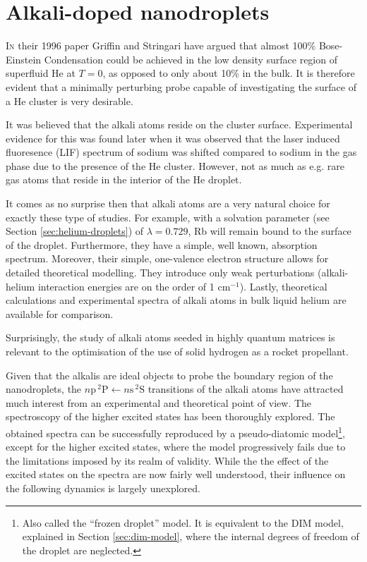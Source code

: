 \chapter{Alkali-doped nanodroplets}

	\lettrine[lines=4,findent=3pt,nindent=0pt]{\color{niceBlue1}I}{n} their 1996 paper\citep{Griffin1996} Griffin and Stringari have argued that almost 100\% Bose-Einstein Condensation could be achieved in the low density surface region of superfluid He at $T=0$, as opposed to only about 10\% in the bulk. It is therefore evident that a minimally perturbing probe capable of investigating the surface of a He cluster is very desirable.

	It was believed\citep{Dalfovo1994} that the alkali atoms reside on the cluster surface. Experimental evidence for this was found\citep{Stienkemeier1995-1,Stienkemeier1995-2,Ancilotto1995} later when it was observed that the laser induced fluoresence (LIF) spectrum of sodium was shifted compared to sodium in the gas phase due to the presence of the He cluster. However, not as much as e.g. rare gas atoms that reside in the interior of the He droplet.
	
	It comes as no surprise then that alkali atoms are a very natural choice for exactly these type of studies.  For example, with a solvation parameter (see Section \ref{sec:helium-droplets}) of $\lambda=0.729$\citep{Anc95}, Rb will remain bound to the surface of the droplet. Furthermore, they have a simple, well known, absorption spectrum. Moreover, their simple, one-valence electron structure allows for detailed theoretical modelling. They introduce only weak perturbations (alkali-helium interaction energies are on the order of 1 cm$^{-1}$\citep{Pat91}). Lastly, theoretical calculations\citep{Ancilotto1995,Kanorsky1994} and experimental spectra\citep{Tabbert1995,Takahashi1993,Beijersbergen1993} of alkali atoms in bulk liquid helium are available for comparison.

	Surprisingly, the study of alkali atoms seeded in highly quantum matrices is relevant to the optimisation of the use of solid hydrogen as a rocket propellant\citep{Carrick1993}.
	
	Given that the alkalis are ideal objects to probe the boundary region of the nanodroplets, the $n\mathrm{p}\,^2\mathrm{P}\!\longleftarrow\!n\mathrm{s}\,^2\mathrm{S}$ transitions of the alkali atoms have attracted much interest from an experimental and theoretical point of view. The spectroscopy of the higher excited states has been thoroughly explored\citep{Log11b,Log11a,Lackner2012,Lackner2013,The11,Fec12,Pif10,Lac11,Theisen2011,Lac13}. The obtained spectra can be successfully reproduced by a pseudo-diatomic model\footnote{Also called the ``frozen droplet'' model. It is equivalent to the DIM model, explained in Section \ref{sec:dim-model}, where the internal degrees of freedom of the droplet are neglected.}, except for the higher excited states, where the model progressively fails due to the limitations imposed by its realm of validity\citep{Sti96,Bunermann2007}. While the the effect of the excited states on the spectra are now fairly well understood, their influence on the following dynamics is largely unexplored.
	
